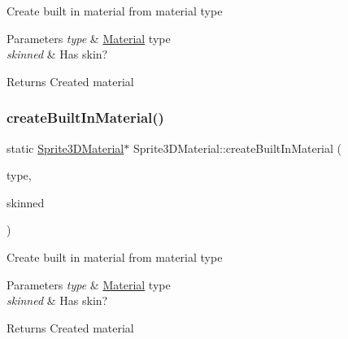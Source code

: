 Create built in material from material type 
\begin{DoxyParams}{Parameters}
{\em type} & \hyperlink{classMaterial}{Material} type \\
\hline
{\em skinned} & Has skin? \\
\hline
\end{DoxyParams}
\begin{DoxyReturn}{Returns}
Created material 
\end{DoxyReturn}
\mbox{\label{classSprite3DMaterial_a44c6d37eb63b3fdfa8c17efba0eb9c10}} 
\subsubsection{\texorpdfstring{create\+Built\+In\+Material()}{createBuiltInMaterial()}\hspace{0.1cm}{\footnotesize\ttfamily [2/4]}}
{\footnotesize\ttfamily static \hyperlink{classSprite3DMaterial}{Sprite3\+D\+Material}$\ast$ Sprite3\+D\+Material\+::create\+Built\+In\+Material (\begin{DoxyParamCaption}\item[{\hyperlink{classSprite3DMaterial_a2b3cb11be78a5f6332cc01d5b7063e32}{Material\+Type}}]{type,  }\item[{bool}]{skinned }\end{DoxyParamCaption})\hspace{0.3cm}{\ttfamily [static]}}

Create built in material from material type 
\begin{DoxyParams}{Parameters}
{\em type} & \hyperlink{classMaterial}{Material} type \\
\hline
{\em skinned} & Has skin? \\
\hline
\end{DoxyParams}
\begin{DoxyReturn}{Returns}
Created material 
\end{DoxyReturn}
\mbox{\label{classSprite3DMaterial_a9da378b7126a4d42492b4f9fd2f19528}} 
